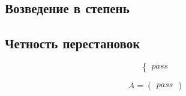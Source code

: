 \documentclass[a4paper]{article}
\begin{document}
\subsection*{Возведение в степень}
\subsection*{Четность перестановок}








\begin{equation*}
 \begin{cases}
   
pass

 \end{cases}
\end{equation*}

\begin{equation*}
A = 
\begin{pmatrix}
  pass
\end{pmatrix}
\end{equation*}
\end{document}
